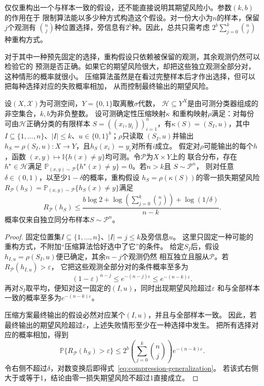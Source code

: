 仅仅重构出一个与样本一致的假设，还不能直接说明其期望风险小。参数$(k,b)$的作用在于
限制算法能以多少种方式构造这个假设。对一份大小为$n$的样本，保留$j$个观测有
$\binom nj$种位置选择，旁信息有$2^b$种。因此，总共只需考虑
$2^b\sum_{j=0}^k\binom nj$种重构方式。

对于其中一种预先固定的选择，重构假设只依赖被保留的观测，其余观测仍然可以检验它的
预测是否正确。如果它的期望风险很大，却把这些独立观测全部分对，这种情形的概率就很小。
压缩算法虽然是在看过完整样本后才作出选择，但可以把每种选择对应的失败概率相加，
从而控制最终输出的期望风险。

\begin{theorem}[一致样本压缩的期望风险上界]
\label{thm:sample-compression-bound}
设$(X,\mathcal X)$为可测空间，$Y=\{0,1\}$取离散$\sigma$代数，
$\mathcal H\subseteq Y^X$是由可测分类器组成的非空集合，$k,b$为非负整数。
设可测确定性压缩映射$\kappa$
和重构映射$\rho$满足：对每份可由$\mathcal H$正确分类的有限样本
$S=((x_i,y_i))_{i=1}^n$，有$\kappa(S)=(S_I,u)$，其中
$I\subseteq\{1,\ldots,n\}$、$|I|\leq k$、$u\in\{0,1\}^b$；$\rho$只读取
$(S_I,u)$并输出$h_S=\rho(S_I,u):X\to Y$，且$h_S(x_i)=y_i$对所有$i$成立。
假定对$\rho$可能输出的每个$h$，函数
$(x,y)\mapsto\mathbb I\{h(x)\neq y\}$均可测。令$\mathcal P$为$X\times Y$上的
联合分布，存在$h^\star\in\mathcal H$满足
$\mathbb P_{(x,y)\sim\mathcal P}\{h^\star(x)\neq y\}=0$。若$n>k$且
$S\sim\mathcal P^n$，
则对任意$\delta\in(0,1)$，以至少$1-\delta$的概率，重构假设
$h_S=\rho(\kappa(S))$的零一损失期望风险
$R_{\mathcal P}(h_S)=\mathbb P_{(x,y)\sim\mathcal P}\{h_S(x)\neq y\}$满足
\begin{equation}
 R_{\mathcal P}(h_S)
 \leq\frac{b\log2+\log\!\left(\sum_{j=0}^k\binom nj\right)+\log(1/\delta)}{n-k}.
 \label{eq:compression-generalization}
\end{equation}
概率仅来自独立同分布样本$S\sim\mathcal P^n$。
\end{theorem}

\begin{proof}
固定位置集$I\subseteq\{1,\ldots,n\}$、$|I|=j\leq k$及旁信息$u$。
这里只固定一种可能的重构方式，不附加“压缩算法恰好选中了它”的条件。
给定$S_I$后，假设$h_{I,u}=\rho(S_I,u)$便已确定，其余$n-j$个观测仍然
相互独立且服从$\mathcal P$。若$R_{\mathcal P}(h_{I,u})>\varepsilon$，
它把这些观测全部分对的条件概率至多为
\[
 (1-\varepsilon)^{n-j}\leq e^{-(n-j)\varepsilon}
 \leq e^{-(n-k)\varepsilon}.
\]
再对$S_I$取平均，便知对这一固定的$(I,u)$，同时出现期望风险超过$\varepsilon$
和与全部样本一致的概率至多为$e^{-(n-k)\varepsilon}$。

压缩方案最终输出的假设必然对应某个$(I,u)$，并且与全部样本一致。
因此，若最终输出的期望风险超过$\varepsilon$，上述失败情形至少在一种选择中发生。
把所有选择对应的概率相加，得到
\[
 \mathbb P\{R_{\mathcal P}(h_S)>\varepsilon\}
 \leq 2^b\left(\sum_{j=0}^k\binom nj\right)e^{-(n-k)\varepsilon}.
\]
令右侧不超过$\delta$，对数变换后即得式~\eqref{eq:compression-generalization}。
若该式右侧大于或等于1，结论由零一损失期望风险不超过1直接成立。
\end{proof}

